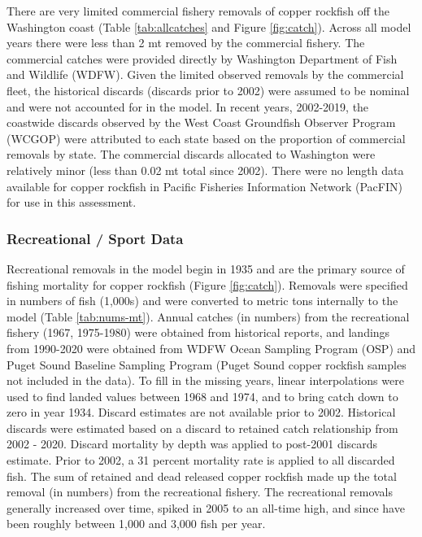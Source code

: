 \documentclass[11pt,
  english,
  a4paper,
]{article}
\begin{document}
There are very limited commercial fishery removals of copper rockfish off the Washington coast (Table \ref{tab:allcatches} and Figure \ref{fig:catch}). Across all model years there were less than 2 mt removed by the commercial fishery. The commercial catches were provided directly by Washington Department of Fish and Wildlife (WDFW). Given the limited observed removals by the commercial fleet, the historical discards (discards prior to 2002) were assumed to be nominal and were not accounted for in the model. In recent years, 2002-2019, the coastwide discards observed by the West Coast Groundfish Observer Program (WCGOP) were attributed to each state based on the proportion of commercial removals by state. The commercial discards allocated to Washington were relatively minor (less than 0.02 mt total since 2002). There were no length data available for copper rockfish in Pacific Fisheries Information Network (PacFIN) for use in this assessment.

\leavevmode\tagmcend\tagstructend\par


\hypertarget{recreational-sport-data}{%
\subsubsection{Recreational / Sport Data}\label{recreational-sport-data}}

\leavevmode\tagmcend\tagstructend


Recreational removals in the model begin in 1935 and are the primary source of fishing mortality for copper rockfish (Figure \ref{fig:catch}). Removals were specified in numbers of fish (1,000s) and were converted to metric tons internally to the model (Table \ref{tab:nums-mt}). Annual catches (in numbers) from the recreational fishery (1967, 1975-1980) were obtained from historical reports, and landings from 1990-2020 were obtained from WDFW Ocean Sampling Program (OSP) and Puget Sound Baseline Sampling Program (Puget Sound copper rockfish samples not included in the data). To fill in the missing years, linear interpolations were used to find landed values between 1968 and 1974, and to bring catch down to zero in year 1934. Discard estimates are not available prior to 2002. Historical discards were estimated based on a discard to retained catch relationship from 2002 - 2020. Discard mortality by depth was applied to post-2001 discards estimate. Prior to 2002, a 31 percent mortality rate is applied to all discarded fish. The sum of retained and dead released copper rockfish made up the total removal (in numbers) from the recreational fishery. The recreational removals generally increased over time, spiked in 2005 to an all-time high, and since have been roughly between 1,000 and 3,000 fish per year.
\end{document}
